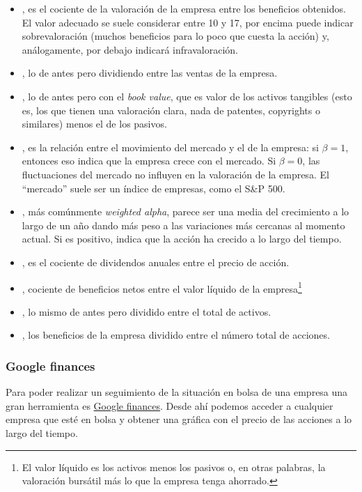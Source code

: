\documentclass[nochap,palatino,shortheader]{apuntes}
\begin{document}
\begin{itemize}
\item {}, es el cociente de la valoración de la empresa entre los beneficios obtenidos. El valor adecuado se suele considerar entre 10 y 17, por encima puede indicar sobrevaloración (muchos beneficios para lo poco que cuesta la acción) y, análogamente, por debajo indicará infravaloración.
\item {}, lo de antes pero dividiendo entre las ventas de la empresa.
\item {}, lo de antes pero con el \textit{book value}, que es valor de los activos tangibles (esto es, los que tienen una valoración clara, nada de patentes, copyrights o similares) menos el de los pasivos.
\item {}, es la relación entre el movimiento del mercado y el de la empresa: si $β = 1$, entonces eso indica que la empresa crece con el mercado. Si $β=0$, las fluctuaciones del mercado no influyen en la valoración de la empresa. El ``mercado'' suele ser un índice de empresas, como el S\&P 500.
\item {}, más comúnmente \textit{weighted alpha}, parece ser una media del crecimiento a lo largo de un año dando más peso a las variaciones más cercanas al momento actual. Si es positivo, indica que la acción ha crecido a lo largo del tiempo.
\item {}, es el cociente de dividendos anuales entre el precio de acción.
\item {}, cociente de beneficios netos entre el valor líquido de la empresa\footnote{El valor líquido es los activos menos los pasivos o, en otras palabras, la valoración bursátil más lo que la empresa tenga ahorrado.}
\item {}, lo mismo de antes pero dividido entre el total de activos.
\item {}, los beneficios de la empresa dividido entre el número total de acciones.
\end{itemize}

\subsubsection{Google finances}
Para poder realizar un seguimiento de la situación en bolsa de una empresa una gran herramienta es \href{https://www.google.com/finance}{Google finances}. Desde ahí podemos acceder a cualquier empresa que esté en bolsa y obtener una gráfica con el precio de las acciones a lo largo del tiempo.
\end{document}
